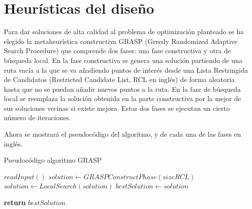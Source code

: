 \section[Heurísticas del diseño]{Heurísticas del diseño}
Para dar soluciones de alta calidad al problema de optimización planteado se ha elegido la metaheurística constructiva GRASP (Greedy Randomized Adaptive Search Procedure) que comprende dos fases: una fase constructiva y otra de búsqueda local. En la fase constructiva se genera una solución partiendo de una ruta vacía a la que se va añadiendo puntos de interés desde una Lista Restringida de Candidatos (Restricted Candidate List, RCL en inglés) de forma aleatoria hasta que no se puedan añadir nuevos puntos a la ruta. En la fase de búsqueda local se reemplaza la solución obtenida en la parte constructiva por la mejor de sus soluciones vecinas si existe mejora. Estas dos fases se ejecutan un cierto número de iteraciones.

Ahora se mostrará el pseudocódigo del algoritmo, y de cada una de las fases en inglés.
\vspace{0.06in}

\begin{algorithm}
	\caption{Pseudocódigo algoritmo GRASP}
	\label{alg:grasp}
\begin{algorithmic}
	\State $ readInput() $
		\State $ solution \gets GRASPConstructPhase(sizeRCL)$
		\State $ solution \gets LocalSearch(solution)$
			\State $ bestSolution \gets solution$
		\EndIf
	\EndFor
	
	\State \textbf{return} $bestSolution$
	\EndFunction
\end{algorithmic}
\end{algorithm}

